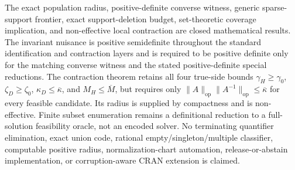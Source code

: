 \documentclass{article}
\begin{document}
The exact population radius, positive-definite converse witness, generic sparse-support frontier, exact support-deletion budget, set-theoretic coverage implication, and non-effective local contraction are closed mathematical results. The invariant nuisance is positive semidefinite throughout the standard identification and contraction layers and is required to be positive definite only for the matching converse witness and the stated positive-definite special reductions. The contraction theorem retains all four true-side bounds \(\gamma_H\geq\gamma_0\), \(\zeta_D\geq\zeta_0\), \(\kappa_D\leq\overline\kappa\), and \(M_H\leq\overline M\), but requires only \(\|A\|_{\mathrm{op}}\|A^{-1}\|_{\mathrm{op}}\leq\overline\kappa\) for every feasible candidate. Its radius is supplied by compactness and is non-effective. Finite subset enumeration remains a definitional reduction to a full-solution feasibility oracle, not an encoded solver. No terminating quantifier elimination, exact union code, rational empty/singleton/multiple classifier, computable positive radius, normalization-chart automation, release-or-abstain implementation, or corruption-aware CRAN extension is claimed.
\end{document}
